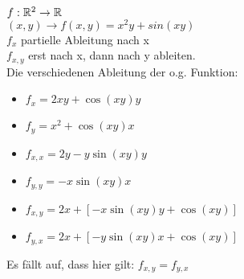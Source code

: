 $ f: \mathbb{R}^2 \rightarrow \mathbb{R} $\\
$ (x,y) \rightarrow f(x,y) = x^2y + sin(xy) $\\
$ f_x $ partielle Ableitung nach x\\
$ f_{x,y} $ erst nach x, dann nach y ableiten. \\

Die verschiedenen Ableitung der o.g. Funktion:
\begin{itemize}
\item $ f_x = 2xy + \cos(xy) y $
\item $ f_{y} = x^2 + \cos(xy) x $
\item $ f_{x,x} = 2y - y \sin(xy) y$
\item $ f_{y,y} = -x \sin(xy) x $
\item $ f_{x,y} = 2x + [-x \sin(xy) y + \cos(xy)] $
\item $ f_{y,x} = 2x + [-y \sin(xy) x + \cos(xy)] $
\end{itemize}
Es fällt auf, dass hier gilt: $ f_{x,y} = f_{y,x} $
